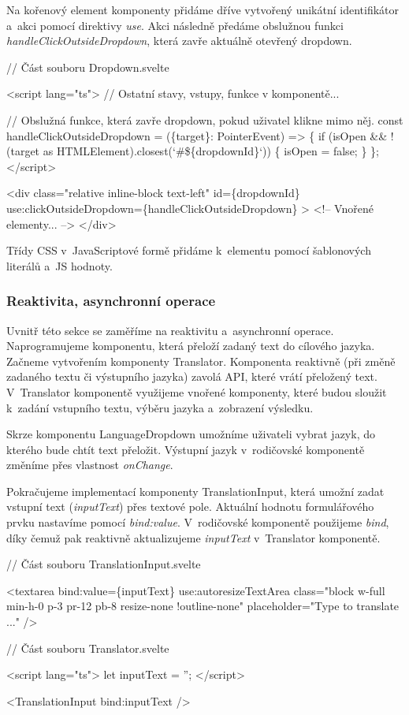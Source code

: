 Na kořenový element komponenty přidáme dříve vytvořený unikátní identifikátor a~akci pomocí direktivy \emph{use}. 
Akci následně předáme obslužnou funkci \emph{handleClickOutsideDropdown}, která zavře aktuálně otevřený dropdown.

\begin{prog}
// Část souboru Dropdown.svelte

<script lang="ts">
  // Ostatní stavy, vstupy, funkce v komponentě...

  // Obslužná funkce, která zavře dropdown, pokud uživatel klikne mimo něj.
  const handleClickOutsideDropdown = (\{target\}: PointerEvent) => \{
    if (isOpen && !(target as HTMLElement).closest(`#\$\{dropdownId\}`)) \{
      isOpen = false;
    \}
  \};
</script>
  
<div
  class="relative inline-block text-left"
  id=\{dropdownId\}
  use:clickOutsideDropdown=\{handleClickOutsideDropdown\}
>
  <!-- Vnořené elementy... -->
</div>
\end{prog}

Třídy CSS v~JavaScriptové formě přidáme k~elementu pomocí šablonových literálů a~JS hodnoty.

\subsubsection*{Reaktivita, asynchronní operace}

Uvnitř této sekce se zaměříme na reaktivitu a~asynchronní operace. Naprogramujeme komponentu, která přeloží zadaný text do cílového jazyka. 
Začneme vytvořením komponenty Translator. Komponenta reaktivně (při změně zadaného textu či výstupního jazyka) zavolá API, které vrátí přeložený text. 
V~Translator komponentě využijeme vnořené komponenty, které budou sloužit k~zadání vstupního textu, výběru jazyka a~zobrazení výsledku.

Skrze komponentu LanguageDropdown umožníme uživateli vybrat jazyk, do kterého bude chtít text přeložit. Výstupní jazyk v~rodičovské komponentě změníme přes vlastnost \emph{onChange}.

Pokračujeme implementací komponenty TranslationInput, která umožní zadat vstupní text (\emph{inputText}) přes textové pole. Aktuální hodnotu formulářového prvku nastavíme pomocí \emph{bind:value}. 
V~rodičovské komponentě použijeme \emph{bind}, díky čemuž pak reaktivně aktualizujeme \emph{inputText} v~Translator komponentě.

\begin{prog}
// Část souboru TranslationInput.svelte

<textarea
  bind:value=\{inputText\}
  use:autoresizeTextArea
  class="block w-full min-h-0 p-3 pr-12 pb-8 resize-none !outline-none"
  placeholder="Type to translate ..."
/>

// Část souboru Translator.svelte

<script lang="ts">
  let inputText = '';
</script>

<TranslationInput bind:inputText />
\end{prog}

